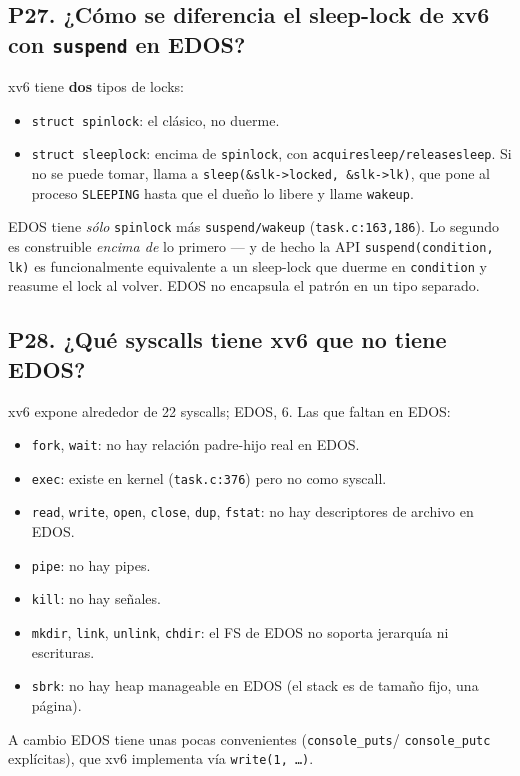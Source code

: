 \documentclass[11pt,a4paper]{article}
\begin{document}
\subsection*{P27. ¿Cómo se diferencia el sleep-lock de xv6 con \texttt{suspend} en EDOS?}

\begin{respuesta}
xv6 tiene \textbf{dos} tipos de locks:

\begin{itemize}[nosep,leftmargin=*]
    \item \texttt{struct spinlock}: el clásico, no duerme.
    \item \texttt{struct sleeplock}: encima de \texttt{spinlock},
        con \texttt{acquiresleep/releasesleep}. Si no se puede
        tomar, llama a \texttt{sleep(\&slk->locked, \&slk->lk)},
        que pone al proceso \texttt{SLEEPING} hasta que el dueño lo
        libere y llame \texttt{wakeup}.
\end{itemize}

EDOS tiene \emph{sólo} \texttt{spinlock} más
\texttt{suspend/wakeup} (\texttt{task.c:163,186}). Lo segundo es
construible \emph{encima de} lo primero — y de hecho la API
\texttt{suspend(condition, lk)} es funcionalmente equivalente a un
sleep-lock que duerme en \texttt{condition} y reasume el lock al
volver. EDOS no encapsula el patrón en un tipo separado.
\end{respuesta}

\subsection*{P28. ¿Qué syscalls tiene xv6 que no tiene EDOS?}

\begin{respuesta}
xv6 expone alrededor de 22 syscalls; EDOS, 6. Las que faltan en
EDOS:

\begin{itemize}[nosep,leftmargin=*]
    \item \texttt{fork}, \texttt{wait}: no hay relación padre-hijo
        real en EDOS.
    \item \texttt{exec}: existe en kernel (\texttt{task.c:376})
        pero no como syscall.
    \item \texttt{read}, \texttt{write}, \texttt{open},
        \texttt{close}, \texttt{dup}, \texttt{fstat}: no hay
        descriptores de archivo en EDOS.
    \item \texttt{pipe}: no hay pipes.
    \item \texttt{kill}: no hay señales.
    \item \texttt{mkdir}, \texttt{link}, \texttt{unlink},
        \texttt{chdir}: el FS de EDOS no soporta jerarquía ni
        escrituras.
    \item \texttt{sbrk}: no hay heap manage\-able en EDOS (el
        stack es de tamaño fijo, una página).
\end{itemize}

A cambio EDOS tiene unas pocas convenientes (\texttt{console\_puts}/
\texttt{console\_putc} explícitas), que xv6 implementa vía
\texttt{write(1, \dots)}.
\end{respuesta}
\end{document}
